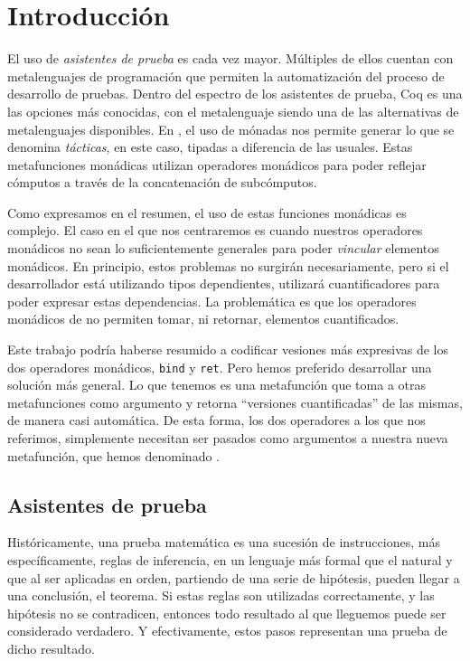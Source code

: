 \chapter{Introducción}\label{ch:intro}

El uso de \emph{asistentes de prueba} es cada vez mayor.
Múltiples de ellos cuentan con metalenguajes de programación que permiten la automatización del proceso de desarrollo de pruebas.
Dentro del espectro de los asistentes de prueba, Coq \cite{CIC} es una las opciones más conocidas, con el metalenguaje \mtac \cite{DBLP:journals/pacmpl/KaiserZKRD18} siendo una de las alternativas de metalenguajes disponibles.
En \Mtac, el uso de mónadas nos permite generar lo que se denomina \emph{tácticas}, en este caso, tipadas a diferencia de las usuales.
Estas metafunciones monádicas utilizan operadores monádicos para poder reflejar cómputos a través de la concatenación de subcómputos.

Como expresamos en el resumen, el uso de estas funciones monádicas es complejo.
El caso en el que nos centraremos es cuando nuestros operadores monádicos no sean lo suficientemente generales para poder \emph{vincular} elementos monádicos.
En principio, estos problemas no surgirán necesariamente, pero si el desarrollador está utilizando tipos dependientes, utilizará cuantificadores para poder expresar estas dependencias. La problemática es que los operadores monádicos de \mtac no permiten tomar, ni retornar, elementos cuantificados.

Este trabajo podría haberse resumido a codificar vesiones más expresivas de los dos operadores monádicos, \lstinline{bind} y \lstinline{ret}.
Pero hemos preferido desarrollar una solución más general.
Lo que tenemos es una metafunción que toma a otras metafunciones como argumento y retorna ``versiones cuantificadas'' de las mismas, de manera casi automática.
De esta forma, los dos operadores a los que nos referimos, simplemente necesitan ser pasados como argumentos a nuestra nueva metafunción, que hemos denominado \lift.

\section{Asistentes de prueba}

Históricamente, una prueba matemática es una sucesión de instrucciones, más específicamente, reglas de inferencia, en un lenguaje más formal que el natural y que al ser aplicadas en orden, partiendo de una serie de hipótesis, pueden llegar a una conclusión, el teorema.
Si estas reglas son utilizadas correctamente, y las hipótesis no se contradicen, entonces todo resultado al que lleguemos puede ser considerado verdadero. Y efectivamente, estos pasos representan una prueba de dicho resultado.

